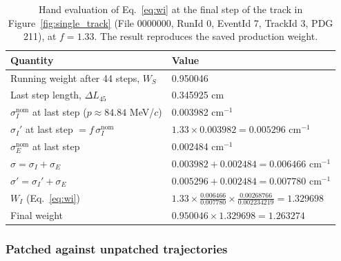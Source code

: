 \documentclass[%
article,
nofootinbib
]{revtex4-2}
\begin{document}
\begin{table}[H]
\centering
\caption{Hand evaluation of Eq.~\ref{eq:wi} at the final step of the
track in Figure~\ref{fig:single_track} (File 0000000, RunId 0, EventId 7,
TrackId 3, PDG 211), at $f = 1.33$. The result reproduces the saved production
weight.}
\label{tab:hand_check}
\setlength{\tabcolsep}{18pt}
\begin{tabular}{ll}
\hline\hline
Quantity & Value \\
\hline
Running weight after 44 steps, $W_S$      & 0.950046 \\
Last step length, $\Delta L_{45}$          & 0.345925 cm \\
$\sigma_I^{\text{nom}}$ at last step ($p \approx 84.84$ MeV/$c$)
                                           & 0.003982 cm$^{-1}$ \\
$\sigma_I'$ at last step $= f\,\sigma_I^{\text{nom}}$
                                           & $1.33 \times 0.003982 = 0.005296$ cm$^{-1}$ \\
$\sigma_E^{\text{nom}}$ at last step        & 0.002484 cm$^{-1}$ \\
$\sigma = \sigma_I + \sigma_E$              & $0.003982 + 0.002484 = 0.006466$ cm$^{-1}$ \\
$\sigma' = \sigma_I' + \sigma_E$            & $0.005296 + 0.002484 = 0.007780$ cm$^{-1}$ \\
$W_I$ (Eq.~\ref{eq:wi})                     & $1.33 \times \frac{0.006466}{0.007780}
                                               \times \frac{0.00268766}{0.002234219}
                                               = 1.329698$ \\
Final weight                                & $0.950046 \times 1.329698 = 1.263274$ \\
\hline\hline
\end{tabular}
\end{table}


\iffalse
\subsubsection{\label{subsec:patched_unpatched}Patched against unpatched
trajectories}
\end{document}
